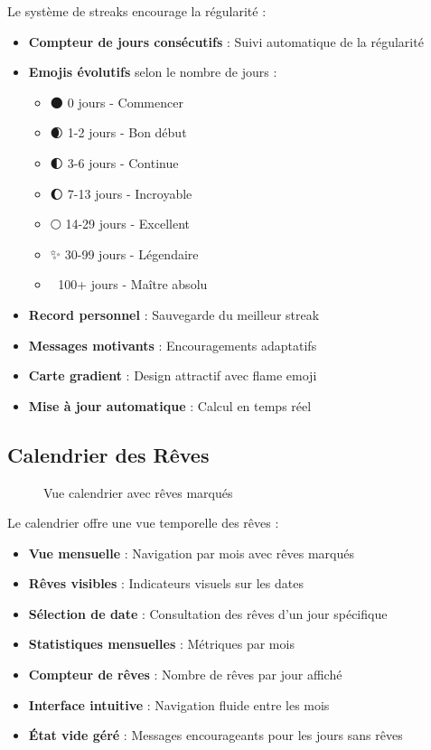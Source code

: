 \documentclass[12pt,a4paper]{article}
\begin{document}
Le système de streaks encourage la régularité :

\begin{itemize}
    \item \textbf{Compteur de jours consécutifs} : Suivi automatique de la régularité
    \item \textbf{Emojis évolutifs} selon le nombre de jours :
    \begin{itemize}
        \item 🌑 0 jours - Commencer
        \item 🌒 1-2 jours - Bon début
        \item 🌓 3-6 jours - Continue
        \item 🌔 7-13 jours - Incroyable
        \item 🌕 14-29 jours - Excellent
        \item ✨ 30-99 jours - Légendaire
        \item 👑 100+ jours - Maître absolu
    \end{itemize}
    \item \textbf{Record personnel} : Sauvegarde du meilleur streak
    \item \textbf{Messages motivants} : Encouragements adaptatifs
    \item \textbf{Carte gradient} : Design attractif avec flame emoji
    \item \textbf{Mise à jour automatique} : Calcul en temps réel
\end{itemize}

\subsection{Calendrier des Rêves}

\begin{figure}[H]
    \centering
    \caption{Vue calendrier avec rêves marqués}
\end{figure}

Le calendrier offre une vue temporelle des rêves :

\begin{itemize}
    \item \textbf{Vue mensuelle} : Navigation par mois avec rêves marqués
    \item \textbf{Rêves visibles} : Indicateurs visuels sur les dates
    \item \textbf{Sélection de date} : Consultation des rêves d'un jour spécifique
    \item \textbf{Statistiques mensuelles} : Métriques par mois
    \item \textbf{Compteur de rêves} : Nombre de rêves par jour affiché
    \item \textbf{Interface intuitive} : Navigation fluide entre les mois
    \item \textbf{État vide géré} : Messages encourageants pour les jours sans rêves
\end{itemize}
\end{document}
